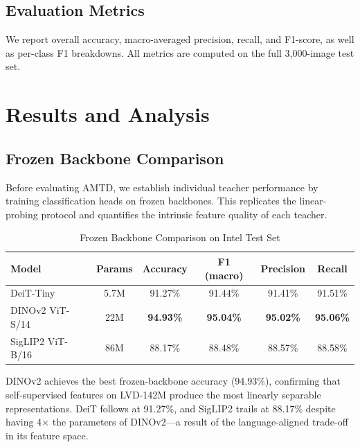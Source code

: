 \documentclass[journal]{IEEEtran}
\begin{document}
\subsection{Evaluation Metrics}

We report overall accuracy, macro-averaged precision, recall, and F1-score, as well as
per-class F1 breakdowns. All metrics are computed on the full 3,000-image test set.

\section{Results and Analysis}
\label{sec:results}

\subsection{Frozen Backbone Comparison}

Before evaluating AMTD, we establish individual teacher performance by training classification
heads on frozen backbones. This replicates the linear-probing protocol and quantifies the
intrinsic feature quality of each teacher.

\begin{table}[!t]
\renewcommand{\arraystretch}{1.3}
\caption{Frozen Backbone Comparison on Intel Test Set}
\label{tab:comparison}
\centering
\begin{tabular}{lccccc}
\toprule
\textbf{Model} & \textbf{Params} & \textbf{Accuracy} & \textbf{F1 (macro)} & \textbf{Precision} & \textbf{Recall} \\
\midrule
DeiT-Tiny             & 5.7M  & 91.27\% & 91.44\% & 91.41\% & 91.51\% \\
DINOv2 ViT-S/14      & 22M   & \textbf{94.93\%} & \textbf{95.04\%} & \textbf{95.02\%} & \textbf{95.06\%} \\
SigLIP2 ViT-B/16     & 86M   & 88.17\% & 88.48\% & 88.57\% & 88.58\% \\
\bottomrule
\end{tabular}
\end{table}

DINOv2 achieves the best frozen-backbone accuracy (94.93\%), confirming that self-supervised
features on LVD-142M produce the most linearly separable representations. DeiT follows at
91.27\%, and SigLIP2 trails at 88.17\% despite having 4$\times$ the parameters of DINOv2---a
result of the language-aligned trade-off in its feature space.
\end{document}
